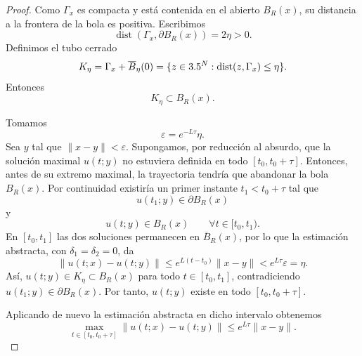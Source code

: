 \begin{proof}
    Como $\Gamma_x$ es compacta y está contenida en el abierto $B_R(x)$, su distancia a la frontera de la bola es positiva. Escribimos
    \[
        \operatorname{dist}(\Gamma_x,\partial B_R(x))=2\eta>0.
    \]
    Definimos el tubo cerrado
    \[
        K_\eta=\Gamma_x+\overline{B}_\eta(0)
        =\{z\in3.5^N:\operatorname{dist}(z,\Gamma_x)\leq\eta\}.
    \]
    Entonces
    \[
        K_\eta\subset B_R(x).
    \]

    \begin{center}
    \end{center}

    Tomamos
    \[
        \varepsilon=e^{-L\tau}\eta.
    \]
    Sea $y$ tal que $\|x-y\|<\varepsilon$. Supongamos, por reducción al absurdo, que la solución maximal $u(t;y)$ no estuviera definida en todo $[t_0,t_0+\tau]$. Entonces, antes de su extremo maximal, la trayectoria tendría que abandonar la bola $B_R(x)$. Por continuidad existiría un primer instante $t_1<t_0+\tau$ tal que
    \[
        u(t_1;y)\in\partial B_R(x)
    \]
    y
    \[
        u(t;y)\in B_R(x)
        \qquad \forall t\in[t_0,t_1).
    \]
    En $[t_0,t_1]$ las dos soluciones permanecen en $\overline{B}_R(x)$, por lo que la estimación abstracta, con $\delta_1=\delta_2=0$, da
    \[
        \|u(t;x)-u(t;y)\|
        \leq e^{L(t-t_0)}\|x-y\|
        <e^{L\tau}\varepsilon
        =\eta.
    \]
    Así, $u(t;y)\in K_\eta\subset B_R(x)$ para todo $t\in[t_0,t_1]$, contradiciendo $u(t_1;y)\in\partial B_R(x)$. Por tanto, $u(t;y)$ existe en todo $[t_0,t_0+\tau]$.

    Aplicando de nuevo la estimación abstracta en dicho intervalo obtenemos
    \[
        \max_{t\in[t_0,t_0+\tau]}
        \|u(t;x)-u(t;y)\|
        \leq e^{L\tau}\|x-y\|.
    \]
\end{proof}

